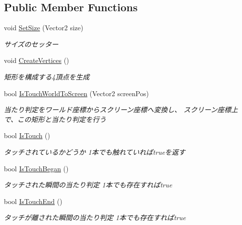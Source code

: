 \subsection*{Public Member Functions}
\begin{DoxyCompactItemize}
\item 
void \hyperlink{class_touch_area_box_a148bf35f6965313f81ba2428e880d165}{Set\+Size} (Vector2 size)
\begin{DoxyCompactList}\small\item\em サイズのセッター \end{DoxyCompactList}\item 
void \hyperlink{class_touch_area_box_aecbf2351ec00a8848239379ddde42ce3}{Create\+Vertices} ()
\begin{DoxyCompactList}\small\item\em 矩形を構成する4頂点を生成 \end{DoxyCompactList}\item 
bool \hyperlink{class_touch_area_box_aecdfd8d0e4d80a9fb445585980386ddd}{Is\+Touch\+World\+To\+Screen} (Vector2 screen\+Pos)
\begin{DoxyCompactList}\small\item\em 当たり判定をワールド座標からスクリーン座標へ変換し、 スクリーン座標上で、この矩形と当たり判定を行う \end{DoxyCompactList}\item 
bool \hyperlink{class_touch_area_box_ab10b28047e2b6af57bac77cac9d90395}{Is\+Touch} ()
\begin{DoxyCompactList}\small\item\em タッチされているかどうか 1本でも触れていればtrueを返す \end{DoxyCompactList}\item 
bool \hyperlink{class_touch_area_box_a0fcd9e196147940919c844c0c4a1fb32}{Is\+Touch\+Began} ()
\begin{DoxyCompactList}\small\item\em タッチされた瞬間の当たり判定 1本でも存在すればtrue \end{DoxyCompactList}\item 
bool \hyperlink{class_touch_area_box_aeeb055b71f5e4cb776f2638bdebd77dd}{Is\+Touch\+End} ()
\begin{DoxyCompactList}\small\item\em タッチが離された瞬間の当たり判定 1本でも存在すればtrue \end{DoxyCompactList}\end{DoxyCompactItemize}
